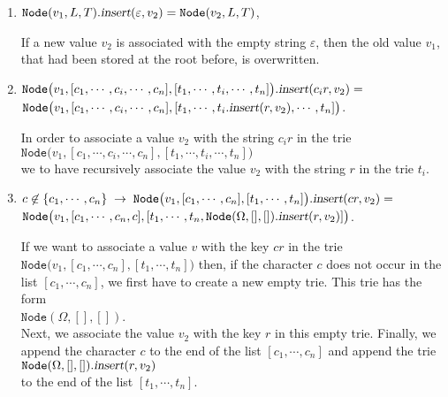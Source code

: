 \begin{enumerate}
\item $\texttt{Node}(v_1,L,T).\textsl{insert}(\varepsilon, v_2) = \texttt{Node}(v_2,L,T)$,
  
      If a new value $v_2$ is associated with the empty string $\varepsilon$, then the old value
      $v_1$, that had been stored at the root before, is overwritten.
\item $\texttt{Node}\bigl(v_1,[c_1,\cdots,c_i,\cdots,c_n], [t_1,\cdots,t_i,\cdots,t_n]\bigr).\textsl{insert}(c_ir,v_2) =$ \\[0.2cm]
      \hspace*{1.3cm}  
      $\texttt{Node}\bigl(v_1,[c_1,\cdots,c_i,\cdots,c_n], [t_1,\cdots,t_i.\textsl{insert}(r,v_2),\cdots,t_n]\bigr)$.

      In order to associate a value $v_2$ with the string $c_ir$ in the trie
      \\[0.2cm]
      \hspace*{1.3cm}
      $\texttt{Node}\bigl(v_1,[c_1,\cdots,c_i,\cdots,c_n], [t_1,\cdots,t_i,\cdots,t_n]\bigr)$ 
      \\[0.2cm]
      we to have recursively associate the value $v_2$ with the string $r$ in the trie $t_i$.
\item $c \not\in\{c_1,\cdots,c_n\} \;\rightarrow\;\texttt{Node}\bigl(v_1,[c_1,\cdots,c_n], [t_1,\cdots,t_n]\bigr).\textsl{insert}(cr,v_2) =$ \\[0.2cm]
      \hspace*{1.3cm}  
      $\texttt{Node}\bigl(v_1,[c_1,\cdots,c_n,c], [t_1,\cdots,t_n,\texttt{Node}(\Omega,[],[]).\textsl{insert}(r,v_2)]\bigr)$.
      
      If we want to associate a value $v$ with the key $cr$ in the trie
      $\texttt{Node}\bigl(v_1,[c_1,\cdots,c_n], [t_1,\cdots,t_n]\bigr)$ then, if the character $c$
      does not occur in the list $[c_1,\cdots,c_n]$, we first have to create a new empty trie.
      This trie has the form \\[0.2cm]
      \hspace*{1.3cm} $\texttt{Node}(\Omega, [], [])$. \\[0.2cm]
      Next, we associate the value $v_2$ with the key $r$ in this empty trie.  Finally,
      we append the character $c$ to the end of the list $[c_1,\cdots,c_n]$ and append the trie
        \\[0.2cm] 
      \hspace*{1.3cm}
      $\texttt{Node}(\Omega, [], []).\textsl{insert}(r,v_2)$ 
      \\[0.2cm]
      to the end of the list $[t_1,\cdots,t_n]$.
\end{enumerate}

